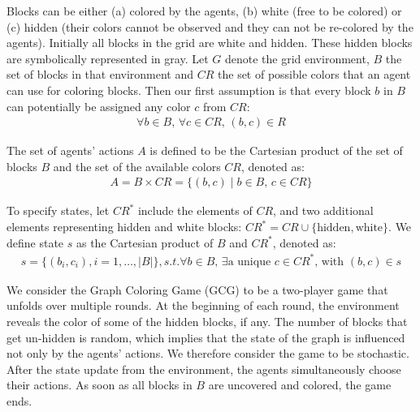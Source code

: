 \begin{flushleft}
\begin{flushleft}
        Blocks can be either (a) colored by the agents, (b) white (free to be colored) or (c) hidden (their colors cannot be observed and they can not be re-colored by the agents). Initially all blocks in the grid are white and hidden. These hidden blocks are symbolically represented in gray. Let $G$ denote the grid environment, $B$ the set of blocks in that environment and $CR$ the set of possible colors that an agent can use for coloring blocks. Then our first assumption is that every block $b$ in $B$ can potentially be assigned any color $c$ from $CR$:
        \begin{eqnarray}
            \forall b \in B, \, \forall c \in CR, \, (b, c) \in R 
            \label{eq:bc}
        \end{eqnarray}

        The set of agents' actions $A$ is defined to be the Cartesian product of the set of blocks $B$ and the set of the available colors $CR$, denoted as:
        \begin{eqnarray}
            A = B \times CR = \{(b, c) \mid b \in B, \, c \in CR\} 
            \label{eq:action_space}
        \end{eqnarray}

        To specify states, let $CR^*$ include the elements of $CR$, and two additional elements representing hidden and white blocks: $CR^* = CR \cup \{\text{hidden}, \text{white}\}$. We define state $s$ as the Cartesian product of $B$ and $CR^*$, denoted as:
        \begin{eqnarray}
            s = \{(b_i, c_i), i=1, \dots, |B|\}, s.t. \forall b \in B, \, \exists \text{a unique } c \in CR^*\text{, with } (b,c) \in s
            \label{eq:state}
        \end{eqnarray}

        We consider the Graph Coloring Game (GCG) to be a two-player game that unfolds over multiple rounds. At the beginning of each round, the environment reveals the color of some of the hidden blocks, if any. The number of blocks that get un-hidden is random, which implies that the state of the graph is influenced not only by the agents' actions. We therefore consider the game to be stochastic. After the state update from the environment, the agents simultaneously choose their actions. As soon as all blocks in $B$ are uncovered and colored, the game ends.
    
    \end{flushleft}


\end{flushleft}
